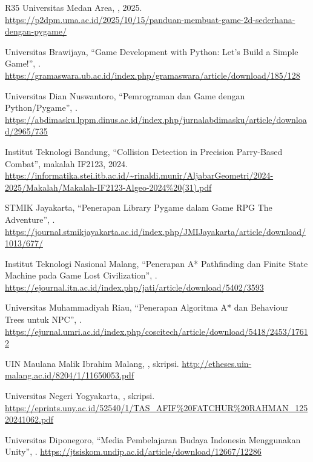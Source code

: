 \begin{sloppypar}
\begin{thebibliography}{R35}
  Universitas Medan Area, , 2025.
  \url{https://p2dpm.uma.ac.id/2025/10/15/panduan-membuat-game-2d-sederhana-dengan-pygame/}

  Universitas Brawijaya, ``Game Development with Python: Let's Build a
  Simple Game!'', .
  \url{https://gramaswara.ub.ac.id/index.php/gramaswara/article/download/185/128}

  Universitas Dian Nuswantoro, ``Pemrograman dan Game dengan
  Python/Pygame'', .
  \url{https://abdimasku.lppm.dinus.ac.id/index.php/jurnalabdimasku/article/download/2965/735}

  Institut Teknologi Bandung, ``Collision Detection in Precision
  Parry-Based Combat'', makalah IF2123, 2024.
  \url{https://informatika.stei.itb.ac.id/~rinaldi.munir/AljabarGeometri/2024-2025/Makalah/Makalah-IF2123-Algeo-2024%20(31).pdf}

  STMIK Jayakarta, ``Penerapan Library Pygame dalam Game RPG The
  Adventure'', .
  \url{https://journal.stmikjayakarta.ac.id/index.php/JMIJayakarta/article/download/1013/677/}

  Institut Teknologi Nasional Malang, ``Penerapan A* Pathfinding dan
  Finite State Machine pada Game Lost Civilization'', .
  \url{https://ejournal.itn.ac.id/index.php/jati/article/download/5402/3593}

  Universitas Muhammadiyah Riau, ``Penerapan Algoritma A* dan Behaviour
  Trees untuk NPC'', .
  \url{https://ejurnal.umri.ac.id/index.php/coscitech/article/download/5418/2453/17612}

  UIN Maulana Malik Ibrahim Malang, , skripsi.
  \url{http://etheses.uin-malang.ac.id/8204/1/11650053.pdf}

  Universitas Negeri Yogyakarta, , skripsi.
  \url{https://eprints.uny.ac.id/52540/1/TAS_AFIF%20FATCHUR%20RAHMAN_12520241062.pdf}

  Universitas Diponegoro, ``Media Pembelajaran Budaya Indonesia
  Menggunakan Unity'', .
  \url{https://jtsiskom.undip.ac.id/article/download/12667/12286}


\end{thebibliography}
\end{sloppypar}
